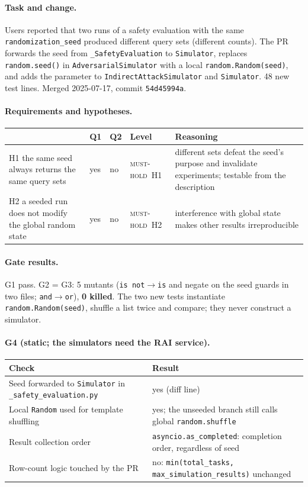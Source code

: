 \documentclass[11pt,a4paper]{article}
\newcommand{\code}[1]{\texttt{#1}}
\newcommand{\musthold}{\textsc{must-hold}}
\newcommand{\sub}[1]{\paragraph{#1}}
\begin{document}
\sub{Task and change.} Users reported that two runs of a safety evaluation with the same \code{randomization\_seed} produced different query sets (different counts). The PR forwards the seed from \code{\_SafetyEvaluation} to \code{Simulator}, replaces \code{random.seed()} in \code{AdversarialSimulator} with a local \code{random.Random(seed)}, and adds the parameter to \code{IndirectAttackSimulator} and \code{Simulator}. 48 new test lines. Merged 2025-07-17, commit \code{54d45994a}.

\sub{Requirements and hypotheses.}
\begin{center}\small\begin{tabularx}{\textwidth}{p{} l l l X}
\toprule & Q1 & Q2 & Level & Reasoning \\ \midrule
H1 the same seed always returns the same query sets & yes & no & \musthold\ H1 & different sets defeat the seed's purpose and invalidate experiments; testable from the description \\
H2 a seeded run does not modify the global random state & yes & no & \musthold\ H2 & interference with global state makes other results irreproducible \\
\bottomrule\end{tabularx}\end{center}

\sub{Gate results.} G1 pass. G2 = G3: 5 mutants (\code{is not$\to$is} and negate on the seed guards in two files; \code{and$\to$or}), \textbf{0 killed}. The two new tests instantiate \code{random.Random(seed)}, shuffle a list twice and compare; they never construct a simulator.

\sub{G4 (static; the simulators need the RAI service).}
\begin{center}\small\begin{tabularx}{\textwidth}{X l}
\toprule Check & Result \\ \midrule
Seed forwarded to \code{Simulator} in \code{\_safety\_evaluation.py} & yes (diff line) \\
Local \code{Random} used for template shuffling & yes; the unseeded branch still calls global \code{random.shuffle} \\
Result collection order & \code{asyncio.as\_completed}: completion order, regardless of seed \\
Row-count logic touched by the PR & no: \code{min(total\_tasks, max\_simulation\_results)} unchanged \\
\bottomrule\end{tabularx}\end{center}
\end{document}
